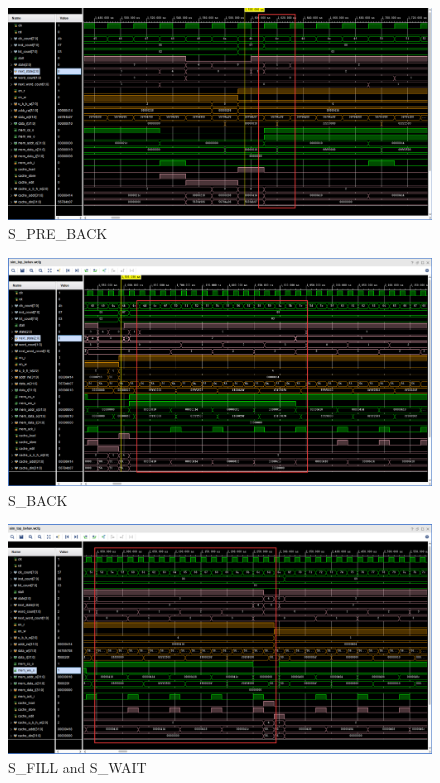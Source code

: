 \begin{figure}[H]
    \centering
    \includegraphics[width=1.0\textwidth]{figs/sres8.png}
    \caption{S\_PRE\_BACK}
    \label{Fig.11}
\end{figure}

\begin{figure}[H]
    \centering
    \includegraphics[width=1.0\textwidth]{figs/sres9.png}
    \caption{S\_BACK}
    \label{Fig.12}
\end{figure}

\begin{figure}[H]
    \centering
    \includegraphics[width=1.0\textwidth]{figs/sres10.png}
    \caption{S\_FILL and S\_WAIT}
    \label{Fig.13}
\end{figure}

